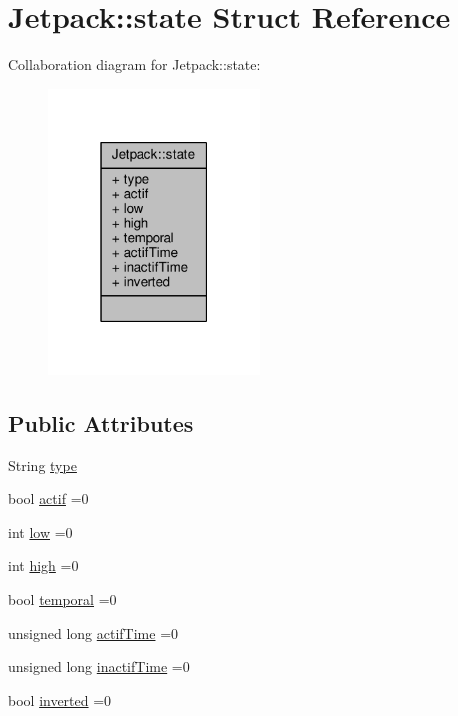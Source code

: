 \hypertarget{structJetpack_1_1state}{}\section{Jetpack\+:\+:state Struct Reference}
\label{structJetpack_1_1state}


Collaboration diagram for Jetpack\+:\+:state\+:\nopagebreak
\begin{figure}[H]
\begin{center}
\leavevmode
\includegraphics[width=159pt]{structJetpack_1_1state__coll__graph}
\end{center}
\end{figure}
\subsection*{Public Attributes}
\begin{DoxyCompactItemize}
\item 
String \hyperlink{structJetpack_1_1state_a9143580871c2e573fb502bb94c1da8e5}{type}
\item 
bool \hyperlink{structJetpack_1_1state_aa177541689bbaea21a4650a083b0df77}{actif} =0
\item 
int \hyperlink{structJetpack_1_1state_ace3ecd2b1f262756d8f7a8adda20136a}{low} =0
\item 
int \hyperlink{structJetpack_1_1state_a54cc9291c7cc30102a07fd2b0ccd8dde}{high} =0
\item 
bool \hyperlink{structJetpack_1_1state_abd6039e7a48856550b0ffbf8bcff7bdd}{temporal} =0
\item 
unsigned long \hyperlink{structJetpack_1_1state_af2e1cc323ef9ffcc3cf4d203f85d726b}{actif\+Time} =0
\item 
unsigned long \hyperlink{structJetpack_1_1state_aaf817b1f9e7a4d65b9e3ca4726b281f6}{inactif\+Time} =0
\item 
bool \hyperlink{structJetpack_1_1state_a6bc03bb8f05b10aa142dbb0c39c87fb5}{inverted} =0
\end{DoxyCompactItemize}


